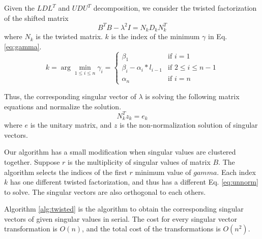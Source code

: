Given the $LDL^T$ and $UDU^T$ decomposition, we consider the twisted factorization of the shifted matrix
\begin{equation}
B^T B - \lambda^2 I = N_k D_k N_k^T
\end{equation}
where $N_k$ is the twisted matrix.
$k$ is the index of the minimum $\gamma$ in Eq. \ref{eq:gamma}.
\begin{equation}
\label{eq:gamma}
k = \arg \min_{1\le i \le n} \gamma_{i} =
\begin{cases}
\beta_1 & \text{if } i=1 \\
\beta_i - \alpha_i * l_{i-1} & \text{if } 2\le i\le n-1\\
\alpha_n & \text{if } i=n
\end{cases}
\end{equation}

Thus, the corresponding singular vector of $\lambda$ is solving the following matrix equations and normalize the solution.
\begin{equation}
\label{eq:unnorm}
N_k^T z_k = e_k
\end{equation}
where $e$ is the unitary matrix, and $z$ is the non-normalization solution of singular vectors.

Our algorithm has a small modification when singular values are clustered together.
Suppose $r$ is the multiplicity of singular values of matrix $B$. 
The algorithm selects the indices of the first $r$ minimum value of $gamma$.
Each index $k$ has one different twisted factorization, and thus has a different Eq. \ref{eq:unnorm} to solve.
The singular vectors are also orthogonal to each others\cite{09NLAAtwisted}.

Algorithm \ref{alg:twisted} is the algorithm to obtain the corresponding singular vectors of given singular values in serial.
The cost for every singular vector transformation is $O(n)$, and the total cost of the transformations is $O(n^2)$.

